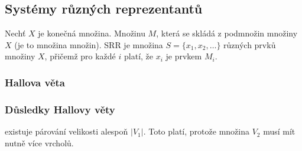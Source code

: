 \subsection{Systémy různých reprezentantů}\label{alg:srr-v-bip-grafech}

Nechť $X$ je konečná množina.
Množinu $M$, která se skládá z podmnožin množiny $X$ (je to množina množin).
SRR je množina $S = \{x_1, x_2, \ldots\}$ různých prvků množiny $X$, přičemž pro každé $i$ platí, že $x_i$ je prvkem $M_i$.

\subsubsection{Hallova věta}

\label{lemma:hallova-veta}

\subsubsection{Důsledky Hallovy věty}

 existuje párování velikosti alespoň $|V_1|$.
Toto platí, protože množina $V_2$ musí mít nutně více vrcholů.